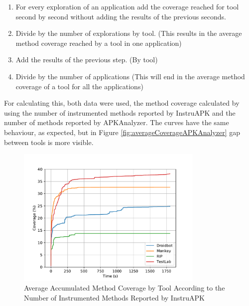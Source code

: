 \begin{enumerate}
\item For every exploration of an application add the coverage reached for tool second by second without adding the results of the previous seconds.
\item Divide by the number of explorations by tool. (This results in the average method coverage reached by a tool in one application)
\item Add the results of the previous step. (By tool)
\item Divide by the number of applications (This will end in the average method coverage of a tool for all the applications)
\end{enumerate} 

For calculating this, both data were used, the method coverage calculated by using the number of instrumented methods reported by InstruAPK and the number of methods reported by APKAnalyzer. The curves have the same behaviour, as expected, but in Figure \ref{fig:averageCoverageAPKAnalyzer} gap between tools is more visible.

\begin{figure}[h]
\centering
\includegraphics[width=0.8\textwidth]{../Figures/averageCoverageInstruAPK.pdf}
\caption{Average Accumulated Method Coverage by Tool According to the Number of Instrumented Methods Reported by InstruAPK}\label{fig:averageCoverageInstruAPK}
\end{figure}

